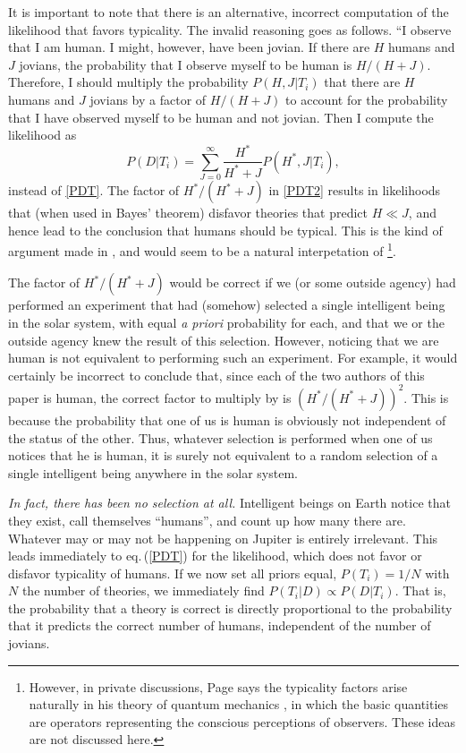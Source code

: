 \documentclass[pra,floatfix,preprint,nofootinbib,12pt]{revtex4}
\def\eq#1{eq.$\,$(\ref{#1})}
\begin{document}
It is important to note that there is an alternative, incorrect computation of the likelihood that 
favors typicality.   The invalid reasoning goes as follows.  ``I observe that I am human.  
I might, however, have been jovian.
If there are $H$ humans and $J$ jovians, the probability that I observe myself to be human
is $H/(H+J)$.  Therefore, I should multiply the probability $P(H,J|T_i)$ that there are 
$H$ humans and $J$ jovians by a factor of
${H}/({H}+J)$ to account for the probability that I have observed myself to be human and not
jovian.  Then I compute the likelihood as
\begin{equation}
P(D|T_i) = \sum_{J=0}^\infty \frac{H^*}{H^*+J} P({H^*},J|T_i),
\label{PDT2}
\end{equation} 
instead of \eqref{PDT}.
The factor of ${H^*}/({H^*}+J)$ in \eqref{PDT2} results in likelihoods that 
(when used in Bayes' theorem) disfavor theories that predict $H \ll J$,
and hence lead to the conclusion that humans should be typical. This is the kind of argument made in \cite{DKS02,BF06}, and would seem to be a natural interpetation of
\cite{Page06a,Page06b,Page06c,Page06d}\footnote{However, in private discussions, 
Page says the typicality factors arise naturally in his theory of quantum mechanics \cite{Pageqm},
in which the basic quantities are operators representing the conscious perceptions of observers.  These ideas are not discussed here.}. 

The factor of $H^*/(H^*+J)$ would be correct if we (or some outside agency) 
had performed an experiment that had (somehow) selected a single intelligent being in the 
solar system, with equal {\it a priori\/}
probability for each, and that we or the outside agency  knew the result of this selection. 
However, noticing that we are human is not equivalent to performing such an experiment.  
For example,
it would certainly be incorrect to conclude that, since each of the two authors of this paper
is human, the correct factor to multiply by is $({H^*}/({H^*}+J))^2$.  This is because the 
probability that one of us is human is obviously not independent of the status of the other.
Thus, whatever selection is performed when one of us notices that he is human,
it is surely not equivalent to a random selection of a single intelligent being anywhere 
in the solar system.  

{\it  In fact, there has been no selection at all.  }
Intelligent beings on Earth notice that they exist, call themselves ``humans'', 
and count up how many there are.  Whatever may
or may not be happening on Jupiter is entirely irrelevant.
This leads immediately to \eq{PDT} for the likelihood, which does not 
favor or disfavor typicality of humans.  
If we now set all priors equal, $P(T_i)=1/N$ with
$N$ the number of theories, we immediately find $P(T_i|D) \propto P(D|T_i)$.
That is, the probability that a theory is correct is directly proportional to the probability
that it predicts the correct number of humans, independent of the number of jovians.
\end{document}
